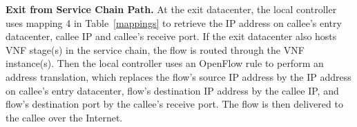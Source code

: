 





\noindent\textbf{Exit from Service Chain Path.}
At the exit datacenter, the local controller uses mapping 4 in Table~\ref{mappings} to retrieve the IP address on callee's entry datacenter, callee IP and callee's receive port. If the exit datacenter also hosts VNF stage(s) in the service chain, the flow is routed through the VNF instance(s). %
Then the local controller uses an OpenFlow rule to perform an address translation, which replaces the flow's source IP address by the IP address on callee's entry datacenter, flow's destination IP address by the callee IP, and flow's destination port by the callee's receive port. The flow is then delivered to the callee over the Internet.

